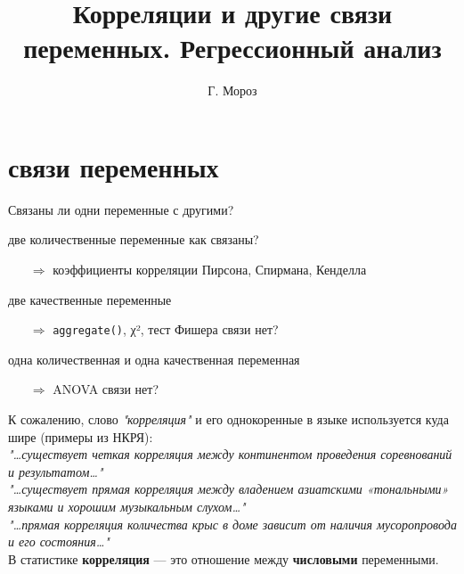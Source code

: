 
\usepackage{subfig}
\newcommand{\mcrot}[4]{\multicolumn{#1}{#2}{\rlap{\rotatebox{#3}{#4}~}}} 
\title[]{Корреляции и другие связи переменных. Регрессионный анализ}
\author[]{Г. Мороз}
\date{}

\frame{\titlepage}
\section{связи переменных}
\begin{frame}{Связаны ли одни переменные с другими?}
\begin{itemize}
\mytem две количественные переменные \hfill \alert{как связаны?}
\begin{itemize}
\item[$\Rightarrow$] коэффициенты корреляции Пирсона, Спирмана, Кенделла
\end{itemize}
\mytem две качественные переменные 
\begin{itemize}
\item[$\Rightarrow$] \scriptsize\verb"aggregate()"\normalsize, χ², тест Фишера  \hfill \alert{связи нет?}
\end{itemize}
\mytem одна количественная и одна качественная переменная
\begin{itemize}
\item[$\Rightarrow$] ANOVA  \hfill \alert{связи нет?}
\end{itemize}
\end{itemize}
\vfill
К сожалению, слово \textit{"корреляция"} и его однокоренные в языке используется куда шире (примеры из НКРЯ):\\
\small
\textit{"…существует четкая корреляция между континентом проведения соревнований и результатом…"}\\
\textit{"…существует прямая корреляция между владением азиатскими «тональными» языками и хорошим музыкальным слухом…"}\\
\textit{"…прямая корреляция количества крыс в доме зависит от наличия мусоропровода и его состояния…"}\\
\normalsize
В статистике \textbf{корреляция} — это отношение между \textbf{числовыми} переменными.
\end{frame}
